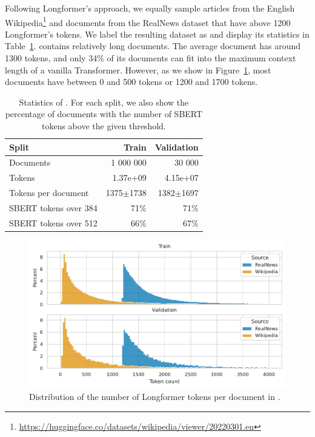 Following Longformer's approach, we equally sample articles from the English
Wikipedia\footnote{\url{https://huggingface.co/datasets/wikipedia/viewer/20220301.en}}
and documents from the RealNews dataset \citep{zellers2019defending} that have
above 1200 Longformer's tokens. We label the resulting dataset as
 and display its statistics in
Table~\ref{table:train_data_stats}.  contains relatively long
documents. The average document has around 1300 tokens, and only 34\% of its
documents can fit into the maximum context length of a vanilla Transformer.
However, as we show in Figure~\ref{fig:train_data_dist}, most documents have
between 0 and 500 tokens or 1200 and 1700 tokens.

\begin{table}
    \centering
\begin{tabular}{lrr}
\toprule
Split & Train & Validation \\
\midrule
Documents & 1 000 000 & 30 000 \\
Tokens & 1.37e+09 & 4.15e+07 \\
Tokens per document & 1375$\pm$1738 & 1382$\pm$1697 \\
SBERT tokens over 384 & 71\% & 71\% \\
SBERT tokens over 512 & 66\% & 67\% \\
\bottomrule
\end{tabular}


    \caption{Statistics of . For each split, we also show
    the percentage of documents with the number of SBERT tokens above the given
    threshold.}

    \label{table:train_data_stats}

\end{table}

\begin{figure}
    \includegraphics[width=\textwidth]{./img/train_data_dist.pdf}

    \caption{Distribution of the number of Longformer tokens per document in
    .}

    \label{fig:train_data_dist}
\end{figure}


